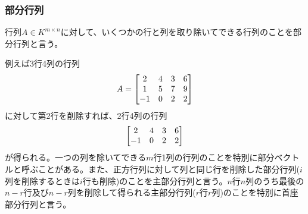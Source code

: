 \documentclass[dvipdfmx, 9pt, a4paper]{jsarticle}
\numberwithin{equation}{subsection}
\begin{document}
\subsubsection{部分行列}
\begin{tcolorbox}[title=部分行列]
行列$A \in K^{m \times n}$に対して、いくつかの行と列を取り除いてできる行列のことを部分行列と言う。
\end{tcolorbox}\par
例えば3行4列の行列
\begin{equation}
A=
\begin{bmatrix}
2 & 4 & 3 & 6 \\
1 & 5 & 7 & 9 \\
-1 & 0 & 2 & 2
\end{bmatrix} \notag
\end{equation}
に対して第2行を削除すれば、2行4列の行列
\begin{equation}
\begin{bmatrix}
2 & 4 & 3 & 6 \\
-1 & 0 & 2 & 2
\end{bmatrix} \notag
\end{equation}
が得られる。一つの列を除いてできる$m$行1列の行列のことを特別に部分ベクトルと呼ぶことがある。また、正方行列に対して列と同じ行を削除した部分行列($i$列を削除するときは$i$行も削除)のことを主部分行列と言う。$n$行$n$列のうち最後の$n-r$行及び$n-r$列を削除して得られる主部分行列($r$行$r$列)のことを特別に首座部分行列と言う。
\end{document}
